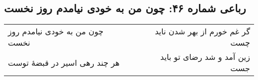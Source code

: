 \begin{center}
\section*{رباعی شماره ۴۶: چون من به خودی نیامدم روز نخست}
\label{sec:sh046}
\begin{longtable}{l p{0.5cm} r}
چون من به خودی نیامدم روز نخست
&&
گر غم خورم از بهر شدن ناید چست
\\
هر چند رهی اسیر در قبضهٔ توست
&&
زین آمد و شد رضای تو باید جست
\\
\end{longtable}
\end{center}
